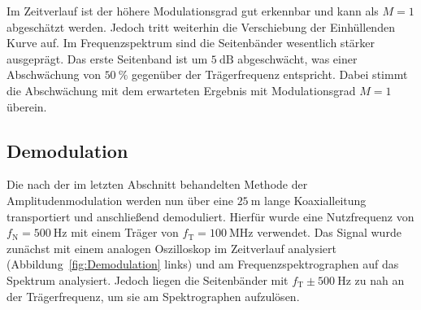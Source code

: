 \documentclass[a4paper,twoside,final]{article}
\begin{document}
Im Zeitverlauf ist der höhere Modulationsgrad gut erkennbar und kann als $M = 1$ abgeschätzt werden. Jedoch tritt weiterhin die Verschiebung der Einhüllenden Kurve auf. Im Frequenzspektrum sind die Seitenbänder wesentlich stärker ausgeprägt. Das erste Seitenband ist um $\SI{5}{\deci\bel}$ abgeschwächt, was einer Abschwächung von $\SI{50}{\percent}$ gegenüber der Trägerfrequenz entspricht. Dabei stimmt die Abschwächung mit dem erwarteten Ergebnis mit Modulationsgrad $M =1$ überein.
\subsection{Demodulation}
Die nach der im letzten Abschnitt behandelten Methode der Amplitudenmodulation werden nun über eine $\SI{25}{\metre}$ lange Koaxialleitung transportiert und anschließend demoduliert. Hierfür wurde eine Nutzfrequenz von $f_\text{N} =\SI{500}{\hertz}$ mit einem Träger von $f_\text{T}=\SI{100}{\mega\hertz}$ verwendet. Das Signal wurde zunächst mit einem analogen Oszilloskop im Zeitverlauf analysiert (Abbildung~\ref{fig:Demodulation} links) und am Frequenzspektrographen auf das Spektrum analysiert. Jedoch liegen die Seitenbänder mit $f_\text{T}\pm\SI{500}{\hertz}$ zu nah an der Trägerfrequenz, um sie am Spektrographen aufzulösen.
\end{document}
